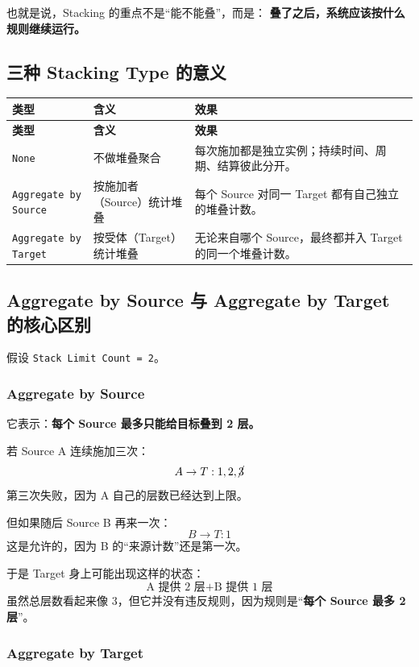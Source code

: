 也就是说，Stacking 的重点不是“能不能叠”，而是：	\textbf{叠了之后，系统应该按什么规则继续运行。}

\subsection{三种 Stacking Type 的意义}

\begin{longtable}{p{0.2\linewidth}p{0.25\linewidth}p{0.55\linewidth}}
	\toprule
	\textbf{类型} & \textbf{含义} & \textbf{效果}\\
	\midrule
	\endfirsthead
	\toprule
	\textbf{类型} & \textbf{含义} & \textbf{效果}\\
	\midrule
	\endhead
	\texttt{None} &
	不做堆叠聚合 &
	每次施加都是独立实例；持续时间、周期、结算彼此分开。\\
	\texttt{Aggregate by Source} &
	按施加者（Source）统计堆叠 &
	每个 Source 对同一 Target 都有自己独立的堆叠计数。\\
	\texttt{Aggregate by Target} &
	按受体（Target）统计堆叠 &
	无论来自哪个 Source，最终都并入 Target 的同一个堆叠计数。\\
	\bottomrule
\end{longtable}

\subsection{Aggregate by Source 与 Aggregate by Target 的核心区别}

假设 \texttt{Stack Limit Count = 2}。

\subsubsection{Aggregate by Source}

它表示：\textbf{每个 Source 最多只能给目标叠到 2 层。}

若 Source A 连续施加三次：
\[
A \to T: 1, 2, \cancel{3}
\]
第三次失败，因为 A 自己的层数已经达到上限。

但如果随后 Source B 再来一次：
\[
B \to T: 1
\]
这是允许的，因为 B 的“来源计数”还是第一次。

于是 Target 身上可能出现这样的状态：
\[
\text{A 提供 2 层} + \text{B 提供 1 层}
\]
虽然总层数看起来像 $3$，但它并没有违反规则，因为规则是“\textbf{每个 Source 最多 2 层}”。

\subsubsection{Aggregate by Target}


